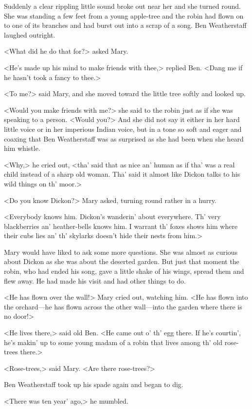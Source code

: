 Suddenly a clear rippling little sound broke out near her and she turned round. She was standing a few feet from a young apple-tree and the robin had flown on to one of its branches and had burst out into a scrap of a song. Ben Weatherstaff laughed outright.

<What did he do that for?> asked Mary.

<He's made up his mind to make friends with thee,> replied Ben. <Dang me if he hasn't took a fancy to thee.>

<To me?> said Mary, and she moved toward the little tree softly and looked up.

<Would you make friends with me?> she said to the robin just as if she was speaking to a person. <Would you?> And she did not say it either in her hard little voice or in her imperious Indian voice, but in a tone so soft and eager and coaxing that Ben Weatherstaff was as surprised as she had been when she heard him whistle.

<Why,> he cried out, <tha' said that as nice an' human as if tha' was a real child instead of a sharp old woman. Tha' said it almost like Dickon talks to his wild things on th' moor.>

<Do you know Dickon?> Mary asked, turning round rather in a hurry.

<Everybody knows him. Dickon's wanderin' about everywhere. Th' very blackberries an' heather-bells knows him. I warrant th' foxes shows him where their cubs lies an' th' skylarks doesn't hide their nests from him.>

Mary would have liked to ask some more questions. She was almost as curious about Dickon as she was about the deserted garden. But just that moment the robin, who had ended his song, gave a little shake of his wings, spread them and flew away. He had made his visit and had other things to do.

<He has flown over the wall!> Mary cried out, watching him. <He has flown into the orchard—he has flown across the other wall—into the garden where there is no door!>

<He lives there,> said old Ben. <He came out o' th' egg there. If he's courtin', he's makin' up to some young madam of a robin that lives among th' old rose-trees there.>

<Rose-trees,> said Mary. <Are there rose-trees?>

Ben Weatherstaff took up his spade again and began to dig.

<There was ten year' ago,> he mumbled.

